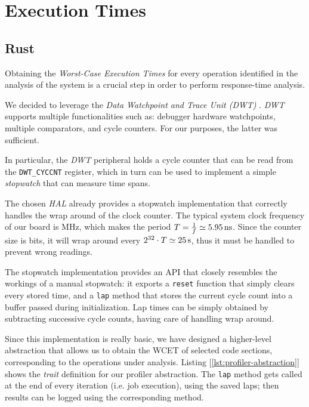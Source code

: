 \section{Execution Times}

\subsection{Rust}

Obtaining the \textit{Worst-Case Execution Times} for every operation identified
in the analysis of the system is a crucial step in order to perform 
response-time analysis.  

We decided to leverage the \textit{Data Watchpoint and Trace Unit (DWT)}
\cite[Chapter~9]{armlimitedARMCortexM42009}. \textit{DWT} supports multiple
functionalities such as: debugger hardware watchpoints, multiple comparators,
and cycle counters. For our purposes, the latter was sufficient. 

In particular, the \textit{DWT} peripheral holds a cycle counter that can be
read from the \texttt{DWT\_CYCCNT} register, which in turn can be used to
implement a simple \textit{stopwatch} that can measure time spans. 

The chosen \textit{HAL} \cite{Stm32rsStm32f4xxhal2025} already provides a
stopwatch implementation that correctly handles the wrap around of the clock
counter. The typical system clock frequency of our board is \unit[168]{MHz},
which makes the period $T = \frac{1}{f} \simeq \unit[5.95]{ns}$. Since the
counter size is \unit[32]{bits}, it will wrap around every $2^{32} \cdot T
\simeq \unit[25]{s}$, thus it must be handled to prevent wrong readings. 

The stopwatch implementation provides an API that closely resembles the workings
of a manual stopwatch: it exports a \texttt{reset} function that simply clears
every stored time, and a \texttt{lap} method that stores the current cycle count
into a buffer passed during initialization. Lap times can be simply obtained by
subtracting successive cycle counts, having care of handling wrap around. 

Since this implementation is really basic, we have designed a higher-level
abstraction that allows us to obtain the WCET of selected code sections,
corresponding to the operations under analysis. 
Listing [\ref{lst:profiler-abstraction}] shows the \textit{trait} definition for
our profiler abstraction. The \texttt{lap} method gets called at the end of
every iteration (i.e. job execution), using the saved laps; then results can be
logged using the corresponding method. 

